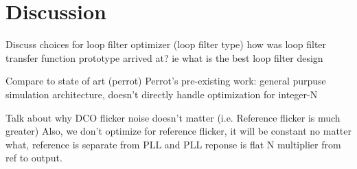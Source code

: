 \section{Discussion}\label{disco}
Discuss choices for loop filter optimizer (loop filter type)
	how was loop filter transfer function prototype arrived at?
	ie what is the best loop filter design

Compare to state of art (perrot)
Perrot's pre-existing work: general purpuse simulation architecture, doesn't directly handle optimization for integer-N

Talk about why DCO flicker noise doesn't matter (i.e. Reference flicker is much greater)
	Also, we don't optimize for reference flicker, it will be constant no matter what,
	reference is separate from PLL and PLL reponse is flat N multiplier from ref to output.